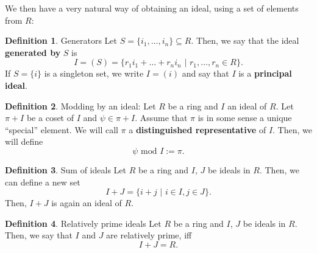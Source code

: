 \documentclass{article}
\theoremstyle{definition}
\newtheorem{definition}{Definition}[section]
\theoremstyle{example}
\renewcommand{\mod}{\,\,\text{mod}\,\,}
\begin{document}
We then have a very natural way of obtaining an ideal, using a set of elements
from $R$:
\begin{definition}{Generators}
  Let $S = \{i_1, \hdots, i_n\} \subseteq R$. Then, we say that the ideal
  \textbf{generated by} $S$ is
  \[
    I = (S) = \{r_1i_1 + \hdots + r_ni_n \,\,|\,\, r_1, \hdots, r_n \in R\}.
  \]
  If $S = \{i\}$ is a singleton set, we write $I = (i)$ and say that $I$ is a
  \textbf{principal ideal}.
\end{definition}
\begin{definition}{Modding by an ideal:}
  \label{def:ideal_mod}
  Let $R$ be a ring and $I$ an ideal of $R$. Let $\pi + I$ be a coset of $I$ and
  $\psi \in \pi + I$. Assume that $\pi$ is in some sense a unique ``special''
  element. We will call $\pi$ a \textbf{distinguished representative} of $I$.
  Then, we will define
  \[
    \psi \mod I := \pi.
  \]
\end{definition}
\begin{definition}{Sum of ideals}
  Let $R$ be a ring and $I$, $J$ be ideals in $R$. Then, we can define a new set
  \[
    I + J = \{i + j \,\,|\,\, i \in I, j \in J\}.
  \]
  Then, $I + J$ is again an ideal of $R$.
\end{definition}
\begin{definition}{Relatively prime ideals}
  Let $R$ be a ring and $I$, $J$ be ideals in $R$. Then, we say that $I$ and $J$
  are relatively prime, iff
  \[
    I + J = R.
  \]
\end{definition}
\end{document}
